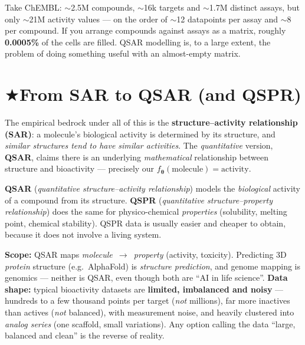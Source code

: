 \documentclass[11pt, oneside]{book}
\makeatletter
\newcommand{\starglyph}{\textcolor{stargold}{\ensuremath{\bigstar}}}
\newcommand{\starsec}[1]{%
  \texorpdfstring{\starglyph\hspace{0.4em}\textcolor{star@frame}{#1}}{#1}}
\newcommand{\params}{\boldsymbol{\theta}}   %
\makeatother
\begin{document}
\begin{notebox}[title={The data is mostly holes}]
Take ChEMBL: $\sim$2.5M compounds, $\sim$16k targets and $\sim$1.7M distinct
assays, but only $\sim$21M activity values --- on the order of $\sim$12 datapoints
per assay and $\sim$8 per compound. If you arrange compounds against assays as a
matrix, roughly \textbf{0.0005\%} of the cells are filled. QSAR modelling is, to a
large extent, the problem of doing something useful with an almost-empty matrix. 
\end{notebox}
\newpage
\section{\starsec{From SAR to QSAR (and QSPR)}}

The empirical bedrock under all of this is the \textbf{structure--activity
relationship (SAR)}: a molecule's biological activity is determined by its
structure, and \emph{similar structures tend to have similar activities}. The
\emph{quantitative} version, \textbf{QSAR}, claims there is an underlying
\emph{mathematical} relationship between structure and bioactivity --- precisely
our $f_{\params}(\text{molecule}) = \text{activity}$.

\begin{defbox}[title={QSAR / QSPR}]
\textbf{QSAR} (\emph{quantitative structure--activity relationship}) models the
\emph{biological} activity of a compound from its structure.
\textbf{QSPR} (\emph{quantitative structure--property relationship}) does the same
for physico-chemical \emph{properties} (solubility, melting point, chemical
stability). QSPR data is usually easier and cheaper to obtain, because it does
not involve a living system.
\end{defbox}

\begin{starbox}[title={Exam-critical: what QSAR is --- and isn't}]
\textbf{Scope:} QSAR maps \emph{molecule~$\to$~property} (activity, toxicity).
Predicting 3D \emph{protein} structure (e.g.\ AlphaFold) is \emph{structure
prediction}, and genome mapping is genomics --- neither is QSAR, even though both
are ``AI in life science''. \textbf{Data shape:} typical bioactivity datasets are
\textbf{limited, imbalanced and noisy} --- hundreds to a few thousand points per
target (\emph{not} millions), far more inactives than actives (\emph{not} balanced),
with measurement noise, and heavily clustered into \emph{analog series} (one
scaffold, small variations). Any option calling the data ``large, balanced and
clean'' is the reverse of reality.
\end{starbox}
\end{document}
